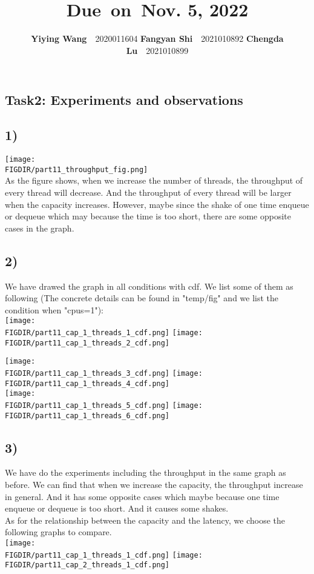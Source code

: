 \documentclass{article}
\title{\textmd{\bf \Class}\\\normalsize\vspace{0.1in}\small{Due\ on\ Nov. 5, 2022}}
\date{}
\author{\textbf{Yiying Wang}\ \ 2020011604 \textbf{Fangyan Shi}\ \ 2021010892  \textbf{Chengda Lu}\ \ 2021010899}
\newcommand{\FIGDIR}{} %
\begin{document}
\begin{spacing}{1.1}
\maketitle \thispagestyle{empty}
\section*{Task2: Experiments and observations}
\subsection*{1)}

\texttt{[image: \\FIGDIR/part11\_throughput\_fig.png]}
\\\indent As the figure shows, when we increase the number of threads, the throughput of every thread will decrease. And the throughput of every thread  will be larger when the capacity increases. However, maybe since the shake of one time enqueue or dequeue which may because the time is too short, there are some opposite cases in the graph.

\subsection*{2)}
\indent We have drawed the graph in all conditions with cdf. We list some of them as following (The concrete details can be found in "temp/fig" and we list the condition when "cpus=1"):
\\\texttt{[image: \\FIGDIR/part11\_cap\_1\_threads\_1\_cdf.png]}
\texttt{[image: \\FIGDIR/part11\_cap\_1\_threads\_2\_cdf.png]}
\newpage

\texttt{[image: \\FIGDIR/part11\_cap\_1\_threads\_3\_cdf.png]}
\texttt{[image: \\FIGDIR/part11\_cap\_1\_threads\_4\_cdf.png]}
\\\texttt{[image: \\FIGDIR/part11\_cap\_1\_threads\_5\_cdf.png]}
\texttt{[image: \\FIGDIR/part11\_cap\_1\_threads\_6\_cdf.png]}

\subsection*{3)}

We have do the experiments including the throughput in the same graph as before. We can find that when we increase the capacity, the throughput increase in general. And it has some opposite cases which maybe because one time enqueue or dequeue is too short. And it causes some shakes. 
\\\indent As for the relationship between the capacity and the latency, we choose the following graphs to compare.
\\\texttt{[image: \\FIGDIR/part11\_cap\_1\_threads\_1\_cdf.png]}
\texttt{[image: \\FIGDIR/part11\_cap\_2\_threads\_1\_cdf.png]}
\newpage


\end{spacing}
\end{document}
